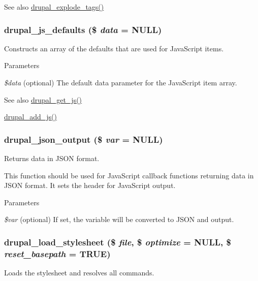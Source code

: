 \begin{DoxySeeAlso}{See also}
\hyperlink{common_8inc_ae5bd302bab285bc819a70737f6121953}{drupal\_\-explode\_\-tags()} 
\end{DoxySeeAlso}
\hypertarget{common_8inc_a55203a07884e02b18a3be2a630c3fab3}{
\subsubsection[{drupal\_\-js\_\-defaults}]{\setlength{\rightskip}{0pt plus 5cm}drupal\_\-js\_\-defaults (\$ {\em data} = {\ttfamily NULL})}}
\label{common_8inc_a55203a07884e02b18a3be2a630c3fab3}
Constructs an array of the defaults that are used for JavaScript items.


\begin{DoxyParams}{Parameters}
\item[{\em \$data}](optional) The default data parameter for the JavaScript item array.\end{DoxyParams}
\begin{DoxySeeAlso}{See also}
\hyperlink{common_8inc_ac4d279ffd40eae67ace8459cd3e6e3b5}{drupal\_\-get\_\-js()} 

\hyperlink{common_8inc_a623370a2c3c2de0390dab078d17dca02}{drupal\_\-add\_\-js()} 
\end{DoxySeeAlso}
\hypertarget{common_8inc_a27dfc2976ed1a73d926838793dc06e1e}{
\subsubsection[{drupal\_\-json\_\-output}]{\setlength{\rightskip}{0pt plus 5cm}drupal\_\-json\_\-output (\$ {\em var} = {\ttfamily NULL})}}
\label{common_8inc_a27dfc2976ed1a73d926838793dc06e1e}
Returns data in JSON format.

This function should be used for JavaScript callback functions returning data in JSON format. It sets the header for JavaScript output.


\begin{DoxyParams}{Parameters}
\item[{\em \$var}](optional) If set, the variable will be converted to JSON and output. \end{DoxyParams}
\hypertarget{common_8inc_a9c43f07915b6da92d97792c2b968a4cd}{
\subsubsection[{drupal\_\-load\_\-stylesheet}]{\setlength{\rightskip}{0pt plus 5cm}drupal\_\-load\_\-stylesheet (\$ {\em file}, \/  \$ {\em optimize} = {\ttfamily NULL}, \/  \$ {\em reset\_\-basepath} = {\ttfamily TRUE})}}
\label{common_8inc_a9c43f07915b6da92d97792c2b968a4cd}
Loads the stylesheet and resolves all  commands.


